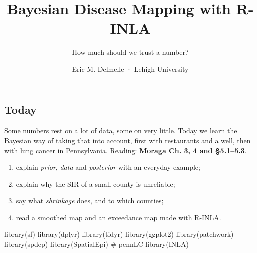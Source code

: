 \documentclass[
  letterpaper,
  DIV=11,
  numbers=noendperiod]{scrartcl}
\title{Bayesian Disease Mapping with R-INLA}
\subtitle{How much should we trust a number?}
\author{Eric M. Delmelle · Lehigh University}
\date{}
\newenvironment{Shaded}{\begin{snugshade}}{\end{snugshade}}
\newcommand{\CommentTok}[1]{\textcolor[rgb]{0.37,0.37,0.37}{#1}}
\newcommand{\FunctionTok}[1]{\textcolor[rgb]{0.28,0.35,0.67}{#1}}
\newcommand{\NormalTok}[1]{\textcolor[rgb]{0.00,0.23,0.31}{#1}}
\providecommand{\tightlist}{%
  \setlength{\itemsep}{0pt}\setlength{\parskip}{0pt}}
\begin{document}
\maketitle


\subsection*{Today}\label{today}

Some numbers rest on a lot of data, some on very little. Today we learn
the Bayesian way of taking that into account, first with restaurants and
a well, then with lung cancer in Pennsylvania. Reading: \textbf{Moraga
Ch. 3, 4 and §5.1--5.3}.

\begin{tcolorbox}[enhanced jigsaw, colbacktitle=quarto-callout-note-color!10!white, leftrule=.75mm, colframe=quarto-callout-note-color-frame, bottomrule=.15mm, left=2mm, titlerule=0mm, title=\textcolor{quarto-callout-note-color}{\faInfo}\hspace{0.5em}{By the end of today you can}, rightrule=.15mm, bottomtitle=1mm, colback=white, toptitle=1mm, coltitle=black, arc=.35mm, breakable, toprule=.15mm, opacitybacktitle=0.6, opacityback=0]

\begin{enumerate}
\def\labelenumi{\arabic{enumi}.}
\tightlist
\item
  explain \emph{prior}, \emph{data} and \emph{posterior} with an
  everyday example;
\item
  explain why the SIR of a small county is unreliable;
\item
  say what \emph{shrinkage} does, and to which counties;
\item
  read a smoothed map and an exceedance map made with R-INLA.
\end{enumerate}

\end{tcolorbox}

\begin{Shaded}
\begin{Highlighting}[]
\FunctionTok{library}\NormalTok{(sf)}
\FunctionTok{library}\NormalTok{(dplyr)}
\FunctionTok{library}\NormalTok{(tidyr)}
\FunctionTok{library}\NormalTok{(ggplot2)}
\FunctionTok{library}\NormalTok{(patchwork)}
\FunctionTok{library}\NormalTok{(spdep)}
\FunctionTok{library}\NormalTok{(SpatialEpi)   }\CommentTok{\# pennLC}
\FunctionTok{library}\NormalTok{(INLA)}
\end{Highlighting}
\end{Shaded}
\end{document}
